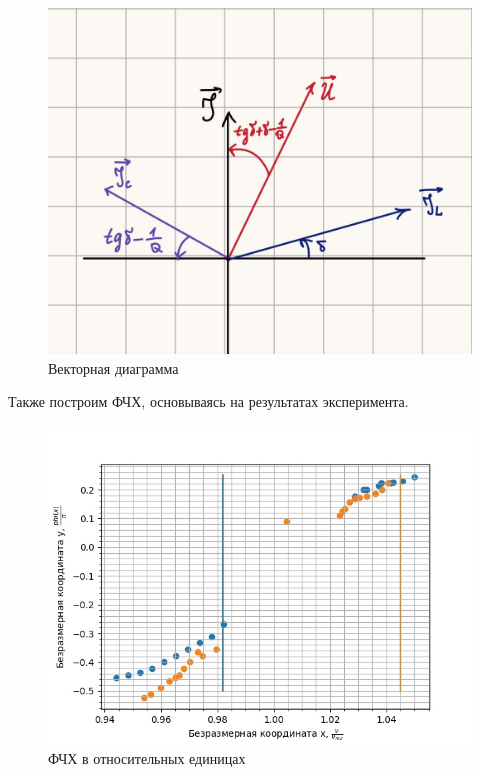 \documentclass[a4paper, 12pt]{article}
\begin{document}
\begin{figure}[h!]
  \begin{center}
    \includegraphics[width = 1\textwidth]{1.jpg}
 \end{center}
 \vspace{-0.5cm}
  \caption{Векторная диаграмма}
\end{figure}
Также построим ФЧХ, основываясь на результатах эксперимента.
\newpage
\begin{figure}[h!]
  \begin{center}
    \includegraphics[width = 1\textwidth]{3WpWcuqtU_s.jpg}
  \end{center}
  \vspace{-0.5cm}
  \caption{ФЧХ в относительных единицах}
\end{figure}
\end{document}
